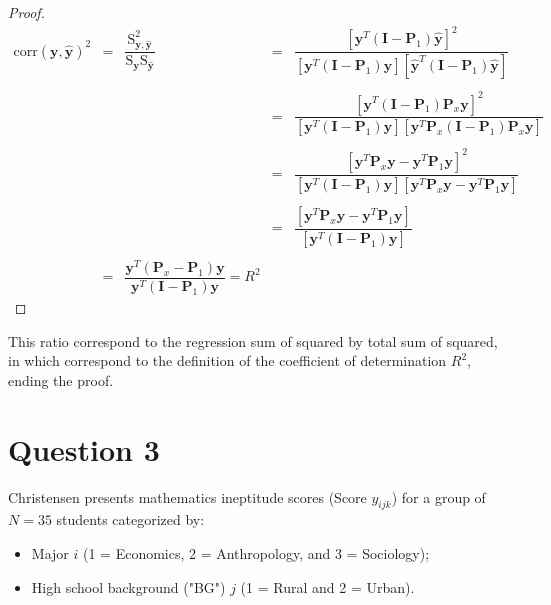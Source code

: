 \documentclass[a4paper, 11pt]{article}
\begin{document}
\begin{proof}
\begin{equation*}
\begin{array}{lclllll}
\mbox{corr}(\textbf{y}, \hat{\textbf{y}})^2 & = & \dfrac{\mbox{S}_{\textbf{y},\hat{\textbf{y}}}^2}{\mbox{S}_{\textbf{y}} \mbox{S}_{\hat{\textbf{y}}}} & = & \dfrac{[ \textbf{y}^T(\textbf{I} - \textbf{P}_1)\hat{\textbf{y}}]^2}{[\textbf{y}^T(\textbf{I} - \textbf{P}_1)\textbf{y}][\hat{\textbf{y}}^T(\textbf{I} - \textbf{P}_1)\hat{\textbf{y}}]} \\\\

& & & = & \dfrac{[ \textbf{y}^T(\textbf{I} - \textbf{P}_1)\textbf{P}_x\textbf{y}]^2}{[\textbf{y}^T(\textbf{I} - \textbf{P}_1)\textbf{y}][\textbf{y}^T\textbf{P}_x(\textbf{I} - \textbf{P}_1)\textbf{P}_x\textbf{y}]} \\\\

& & & = & \dfrac{[ \textbf{y}^T\textbf{P}_x\textbf{y} - \textbf{y}^T\textbf{P}_1\textbf{y}]^2}{[\textbf{y}^T(\textbf{I} - \textbf{P}_1)\textbf{y}] [\textbf{y}^T\textbf{P}_x\textbf{y} - \textbf{y}^T\textbf{P}_1\textbf{y}]} \\ \\


& & & = & \dfrac{[ \textbf{y}^T\textbf{P}_x\textbf{y} - \textbf{y}^T\textbf{P}_1\textbf{y}]}{[\textbf{y}^T(\textbf{I} - \textbf{P}_1)\textbf{y}]}\\\\

& = & \dfrac{\textbf{y}^T(\textbf{P}_x - \textbf{P}_1)\textbf{y}}{\textbf{y}^T(\textbf{I} - \textbf{P}_1)\textbf{y}} = R^2

\end{array}
\end{equation*}

\end{proof}
\noindent 
This ratio correspond to the regression sum of squared by total sum of squared, in which correspond to the definition of the coefficient of determination $R^2$, ending the proof.

\section*{Question 3}

Christensen presents mathematics ineptitude scores (Score $y_{ijk}$) for a group of $N=35$
students categorized by:

\begin{itemize}
\item Major $i$ (1 = Economics, 2 = Anthropology, and 3 = Sociology);
\item High school background ("BG") $j$ (1 = Rural and 2 = Urban).
\end{itemize}
\end{document}
